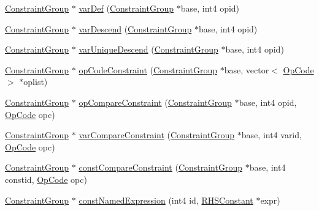 \begin{DoxyCompactItemize}
\item 
\mbox{\hyperlink{class_constraint_group}{Constraint\+Group}} $\ast$ \mbox{\hyperlink{class_rule_compile_a1c85da41f18b2470001e5b7c6aced831}{var\+Def}} (\mbox{\hyperlink{class_constraint_group}{Constraint\+Group}} $\ast$base, int4 opid)
\item 
\mbox{\hyperlink{class_constraint_group}{Constraint\+Group}} $\ast$ \mbox{\hyperlink{class_rule_compile_a4fa11cc8b559d659200a8b00715ec463}{var\+Descend}} (\mbox{\hyperlink{class_constraint_group}{Constraint\+Group}} $\ast$base, int4 opid)
\item 
\mbox{\hyperlink{class_constraint_group}{Constraint\+Group}} $\ast$ \mbox{\hyperlink{class_rule_compile_a76c72454129a3e8e7113fa8621859789}{var\+Unique\+Descend}} (\mbox{\hyperlink{class_constraint_group}{Constraint\+Group}} $\ast$base, int4 opid)
\item 
\mbox{\hyperlink{class_constraint_group}{Constraint\+Group}} $\ast$ \mbox{\hyperlink{class_rule_compile_a5c0c4bcdc62212e9125fbaf7ce2601f9}{op\+Code\+Constraint}} (\mbox{\hyperlink{class_constraint_group}{Constraint\+Group}} $\ast$base, vector$<$ \mbox{\hyperlink{opcodes_8hh_abeb7dfb0e9e2b3114e240a405d046ea7}{Op\+Code}} $>$ $\ast$oplist)
\item 
\mbox{\hyperlink{class_constraint_group}{Constraint\+Group}} $\ast$ \mbox{\hyperlink{class_rule_compile_a6faf8d2d0465b5ef1ffb6d2542a0761e}{op\+Compare\+Constraint}} (\mbox{\hyperlink{class_constraint_group}{Constraint\+Group}} $\ast$base, int4 opid, \mbox{\hyperlink{opcodes_8hh_abeb7dfb0e9e2b3114e240a405d046ea7}{Op\+Code}} opc)
\item 
\mbox{\hyperlink{class_constraint_group}{Constraint\+Group}} $\ast$ \mbox{\hyperlink{class_rule_compile_a5d24deccb7cae2c48208d9243fd515aa}{var\+Compare\+Constraint}} (\mbox{\hyperlink{class_constraint_group}{Constraint\+Group}} $\ast$base, int4 varid, \mbox{\hyperlink{opcodes_8hh_abeb7dfb0e9e2b3114e240a405d046ea7}{Op\+Code}} opc)
\item 
\mbox{\hyperlink{class_constraint_group}{Constraint\+Group}} $\ast$ \mbox{\hyperlink{class_rule_compile_a360879b09fea5254d7944eb59b78dc30}{const\+Compare\+Constraint}} (\mbox{\hyperlink{class_constraint_group}{Constraint\+Group}} $\ast$base, int4 constid, \mbox{\hyperlink{opcodes_8hh_abeb7dfb0e9e2b3114e240a405d046ea7}{Op\+Code}} opc)
\item 
\mbox{\hyperlink{class_constraint_group}{Constraint\+Group}} $\ast$ \mbox{\hyperlink{class_rule_compile_a4ea7474b9e16215ca00f88843508173f}{const\+Named\+Expression}} (int4 id, \mbox{\hyperlink{class_r_h_s_constant}{R\+H\+S\+Constant}} $\ast$expr)

\end{DoxyCompactItemize}
